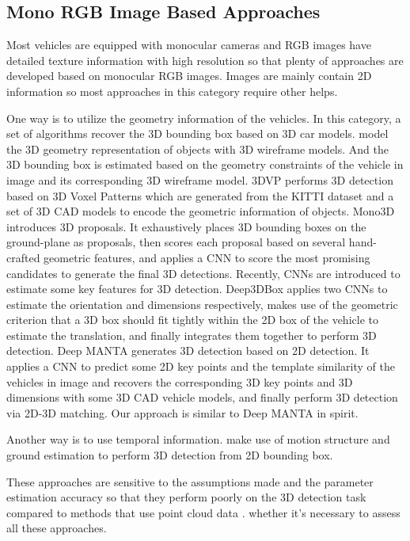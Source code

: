 \subsection{Mono RGB Image Based Approaches}
Most vehicles are equipped with monocular cameras and RGB images have detailed texture information with high resolution so that plenty of approaches are developed based on monocular RGB images. Images are mainly contain 2D information so most approaches in this category require other helps. 

One way is to utilize the geometry information of the vehicles. In this category, a set of algorithms recover the 3D bounding box based on 3D car models. \cite{834, 741} model the 3D geometry representation of objects with 3D wireframe models. And the 3D bounding box is estimated based on the geometry constraints of the vehicle in image and its corresponding 3D wireframe model. 3DVP \cite{xiang2015data} performs 3D detection based on 3D Voxel Patterns which are generated from the KITTI dataset \cite{Geiger2012CVPR} and a set of 3D CAD models to encode the geometric information of objects. Mono3D \cite{cvpr16chen} introduces 3D proposals. It exhaustively places 3D bounding boxes on the ground-plane as proposals, then scores each proposal based on several hand-crafted geometric features, and applies a CNN to score the most promising candidates to generate the final 3D detections. Recently, CNNs are introduced to estimate some key features for 3D detection. Deep3DBox \cite{DBLP:journals/corr/MousavianAFK16} applies two CNNs to estimate the orientation and dimensions respectively, makes use of the geometric criterion that a 3D box should fit tightly within the 2D box of the vehicle to estimate the translation, and finally integrates them together to perform 3D detection. Deep MANTA \cite{DBLP:journals/corr/ChabotCRTC17} generates 3D detection based on 2D detection. It applies a CNN to predict some 2D key points and the template similarity of the vehicles in image and recovers the corresponding 3D key points and 3D dimensions with some 3D CAD vehicle models, and finally perform 3D detection via 2D-3D matching. Our approach is similar to Deep MANTA in spirit.

Another way is to use temporal information. \cite{7780838, 7298997} make use of motion structure and ground estimation to perform 3D detection from 2D bounding box.


These approaches are sensitive to the assumptions made and the parameter estimation accuracy so that they perform poorly on the 3D detection task compared to methods that use point cloud data \tbd. whether it's necessary to assess all these approaches.

